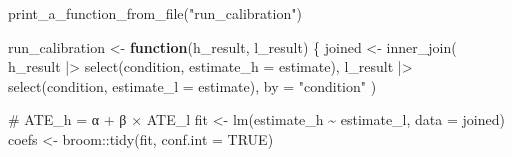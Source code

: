 \documentclass[
  letterpaper,
  DIV=11,
  numbers=noendperiod]{scrartcl}
\newenvironment{Shaded}{\begin{snugshade}}{\end{snugshade}}
\newcommand{\AttributeTok}[1]{\textcolor[rgb]{0.40,0.45,0.13}{#1}}
\newcommand{\CommentTok}[1]{\textcolor[rgb]{0.37,0.37,0.37}{#1}}
\newcommand{\ConstantTok}[1]{\textcolor[rgb]{0.56,0.35,0.01}{#1}}
\newcommand{\ControlFlowTok}[1]{\textcolor[rgb]{0.00,0.23,0.31}{\textbf{#1}}}
\newcommand{\FunctionTok}[1]{\textcolor[rgb]{0.28,0.35,0.67}{#1}}
\newcommand{\NormalTok}[1]{\textcolor[rgb]{0.00,0.23,0.31}{#1}}
\newcommand{\OtherTok}[1]{\textcolor[rgb]{0.00,0.23,0.31}{#1}}
\newcommand{\SpecialCharTok}[1]{\textcolor[rgb]{0.37,0.37,0.37}{#1}}
\newcommand{\StringTok}[1]{\textcolor[rgb]{0.13,0.47,0.30}{#1}}
\begin{document}
\begin{Shaded}
\begin{Highlighting}[]
\FunctionTok{print\_a\_function\_from\_file}\NormalTok{(}\StringTok{"run\_calibration"}\NormalTok{)}
\end{Highlighting}
\end{Shaded}

\begin{Shaded}
\begin{Highlighting}[]
\NormalTok{run\_calibration }\OtherTok{\textless{}{-}} \ControlFlowTok{function}\NormalTok{(h\_result, l\_result) \{}
\NormalTok{  joined }\OtherTok{\textless{}{-}} \FunctionTok{inner\_join}\NormalTok{(}
\NormalTok{    h\_result }\SpecialCharTok{|\textgreater{}} \FunctionTok{select}\NormalTok{(condition, }\AttributeTok{estimate\_h =}\NormalTok{ estimate),}
\NormalTok{    l\_result }\SpecialCharTok{|\textgreater{}} \FunctionTok{select}\NormalTok{(condition, }\AttributeTok{estimate\_l =}\NormalTok{ estimate),}
    \AttributeTok{by =} \StringTok{"condition"}
\NormalTok{  )}

  \CommentTok{\# ATE\_h = α + β × ATE\_l}
\NormalTok{  fit   }\OtherTok{\textless{}{-}} \FunctionTok{lm}\NormalTok{(estimate\_h }\SpecialCharTok{\textasciitilde{}}\NormalTok{ estimate\_l, }\AttributeTok{data =}\NormalTok{ joined)}
\NormalTok{  coefs }\OtherTok{\textless{}{-}}\NormalTok{ broom}\SpecialCharTok{::}\FunctionTok{tidy}\NormalTok{(fit, }\AttributeTok{conf.int =} \ConstantTok{TRUE}\NormalTok{)}


\end{Highlighting}
\end{Shaded}
\end{document}
